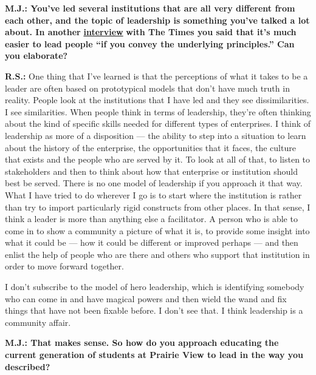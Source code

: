 \textbf{M.J.: You've led several institutions that are all very
different from each other, and the topic of leadership is something
you've talked a lot about. In another}
\href{http://www.nytimes.com/2011/12/04/business/ruth-simmons-of-brown-university-on-amiable-leadership.html}{\textbf{interview}}
\textbf{with The Times you said that it's much easier to lead people
``if you convey the underlying principles.'' Can you elaborate?}

\textbf{R.S.:} One thing that I've learned is that the perceptions of
what it takes to be a leader are often based on prototypical models that
don't have much truth in reality. People look at the institutions that I
have led and they see dissimilarities. I see similarities. When people
think in terms of leadership, they're often thinking about the kind of
specific skills needed for different types of enterprises. I think of
leadership as more of a disposition --- the ability to step into a
situation to learn about the history of the enterprise, the
opportunities that it faces, the culture that exists and the people who
are served by it. To look at all of that, to listen to stakeholders and
then to think about how that enterprise or institution should best be
served. There is no one model of leadership if you approach it that way.
What I have tried to do wherever I go is to start where the institution
is rather than try to import particularly rigid constructs from other
places. In that sense, I think a leader is more than anything else a
facilitator. A person who is able to come in to show a community a
picture of what it is, to provide some insight into what it could be ---
how it could be different or improved perhaps --- and then enlist the
help of people who are there and others who support that institution in
order to move forward together.

I don't subscribe to the model of hero leadership, which is identifying
somebody who can come in and have magical powers and then wield the wand
and fix things that have not been fixable before. I don't see that. I
think leadership is a community affair.

\textbf{M.J.: That makes sense. So how do you approach educating the
current generation of students at Prairie View to lead in the way you
described?}

